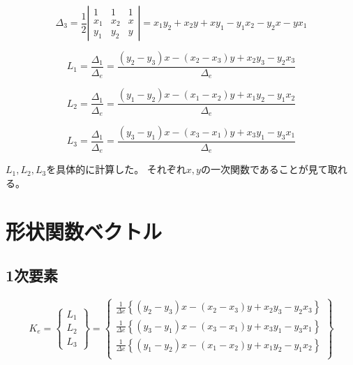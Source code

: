 \documentclass{jarticle}
\begin{document}
\begin{equation}
  \Delta_3 = \frac{1}{2}\left|\begin{array}{ccc}
  1&1&1\\
  x_1&x_2&x\\
  y_1&y_2&y
  \end{array}\right|=x_1 y_2 + x_2 y + x y_1- y_1 x_2 - y_2 x - y x_1
\end{equation}

\begin{equation}
  L_1 = \frac{\Delta_1}{\Delta_e} = \frac{(y_2-y_3)x-(x_2-x_3)y +x_2 y_3 - y_2 x_3}{\Delta_e}
\end{equation}


\begin{equation}
  L_2 = \frac{\Delta_1}{\Delta_e} = \frac{(y_1-y_2)x-(x_1-x_2)y +x_1 y_2 - y_1 x_2}{\Delta_e}
\end{equation}


\begin{equation}
  L_3 = \frac{\Delta_1}{\Delta_e} = \frac{(y_3-y_1)x-(x_3-x_1)y +x_3 y_1 - y_3 x_1}{\Delta_e}
\end{equation}

$L_1, L_2, L_3$を具体的に計算した。
それぞれ$x,y$の一次関数であることが見て取れる。

\section{形状関数ベクトル}



\subsection{1次要素}
\begin{equation}
  K_e = \left\{\begin{array}{c}
      L_1\\
      L_2\\
      L_3
  \end{array}\right\} = \left\{\begin{array}{c}
  \frac{1}{\Delta e}\left\{(y_2-y_3)x-(x_2-x_3)y +x_2 y_3 - y_2 x_3\right\}\\
  \frac{1}{\Delta e}\left\{(y_3-y_1)x-(x_3-x_1)y +x_3 y_1 - y_3 x_1\right\}\\
  \frac{1}{\Delta e}\left\{(y_1-y_2)x-(x_1-x_2)y +x_1 y_2 - y_1 x_2\right\}\\
  \end{array}\right\}
\end{equation}
\end{document}
